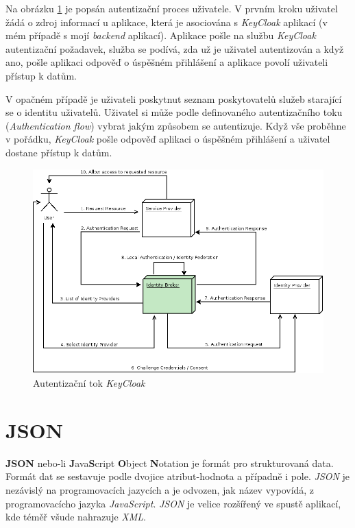 \newpage
Na obrázku \ref{figure:keycloak_flow} je popsán autentizační proces uživatele. V prvním kroku uživatel žádá o zdroj informací u aplikace, která je asociována s \emph{KeyCloak} aplikací (v mém případě s mojí \emph{backend} aplikací).
Aplikace pošle na službu \emph{KeyCloak} autentizační požadavek, služba se podívá, zda už je uživatel autentizován a když ano, pošle aplikaci odpověď o úspěšném přihlášení a aplikace povolí uživateli přístup k datům.

V opačném případě je uživateli poskytnut seznam poskytovatelů služeb starající se o identitu uživatelů.
Uživatel si může podle definovaného autentizačního toku (\emph{Authentication flow}) vybrat jakým způsobem se autentizuje. Když vše proběhne v pořádku, \emph{KeyCloak} pošle odpověď aplikaci o úspěšném přihlášení a uživatel dostane přístup k datům.

\begin{figure}[hbt]
  \centering
  \includegraphics[width=.8 \linewidth]{obrazky-figures/keycloak_flow.png}
  \caption{Autentizační tok \emph{KeyCloak}}
  \label{figure:keycloak_flow}
\end{figure}

\newpage
\section{JSON}
\label{terminy:json}

\textbf{JSON} nebo-li \textbf{J}ava\textbf{S}cript \textbf{O}bject \textbf{N}otation je formát pro strukturovaná data. Formát dat se sestavuje podle dvojice atribut-hodnota a případně i pole.
\emph{JSON} je nezávislý na programovacích jazycích a je odvozen, jak název vypovídá, z programovacícho jazyka \emph{JavaScript}. \emph{JSON} je velice rozšířený ve spustě aplikací, kde téměř všude nahrazuje \emph{XML}.

